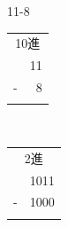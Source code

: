 \documentclass{beamer}                 %
\begin{document}
\begin{frame}[fragile]
\begin{minipage}{0.48\columnwidth}
\begin{itembox}[l]{11-8}
{\begin{tabular}{r r}
            \multicolumn{2}{c}{10進} \\
              & 11 \\
            - &  8 \\
            \cline{1-2}
              &
          \end{tabular}~~~
          \begin{tabular}{r r}
            \multicolumn{2}{c}{2進} \\
              & 1011 \\
            - & 1000 \\
            \cline{1-2}
              &
          \end{tabular}
        }
      \end{itembox}
    \end{minipage}
    \begin{minipage}{0.48\columnwidth}
    \end{minipage}
\end{frame}
\end{document}
